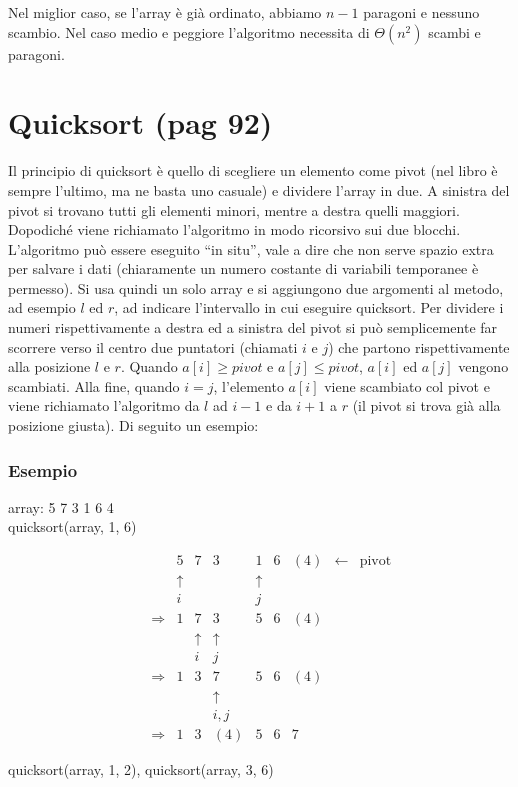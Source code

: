 \documentclass[a4paper]{book}
\begin{document}
Nel miglior caso, se l'array è già ordinato, abbiamo $n-1$ paragoni e nessuno scambio. Nel caso medio e peggiore l'algoritmo necessita di $\Theta (n^2)$ scambi e paragoni.

\section{Quicksort (pag 92)}
Il principio di quicksort è quello di scegliere un elemento come pivot (nel libro è sempre l'ultimo, ma ne basta uno casuale) e dividere l'array in due. A sinistra del pivot si trovano tutti gli elementi minori, mentre a destra quelli maggiori. Dopodiché viene richiamato l'algoritmo in modo ricorsivo sui due blocchi. L'algoritmo può essere eseguito ``in situ'', vale a dire che non serve spazio extra per salvare i dati (chiaramente un numero costante di variabili temporanee è permesso). Si usa quindi un solo array e si aggiungono due argomenti al metodo, ad esempio $l$ ed $r$, ad indicare l'intervallo in cui eseguire quicksort. Per dividere i numeri rispettivamente a destra ed a sinistra del pivot si può semplicemente far scorrere verso il centro due puntatori (chiamati $i$ e $j$) che partono rispettivamente alla posizione $l$ e $r$. Quando $a[i] \geq pivot$ e $a[j] \leq pivot$, $a[i]$ ed $a[j]$ vengono scambiati. Alla fine, quando $i=j$, l'elemento $a[i]$ viene scambiato col pivot e viene richiamato l'algoritmo da $l$ ad $i-1$ e da $i+1$ a $r$ (il pivot si trova già alla posizione giusta). Di seguito un esempio:
\subsubsection*{Esempio}
\begin{center}
array: 5 7 3 1 6 4\\
quicksort(array, 1, 6)
\end{center}
\[\begin{array}{*{20}{c}}
{}&{}&{}&5&7&3&1&6&{(4)}& \leftarrow &{{\text{pivot}}}\\
{}&{}&{}& \uparrow &{}&{}& \uparrow &{}&{}&{}&{}\\
{}&{}&{}&i&{}&{}&j&{}&{}&{}&{}\\
{}&{}& \Rightarrow &1&7&3&5&6&{(4)}&{}&{}\\
{}&{}&{}&{}& \uparrow & \uparrow &{}&{}&{}&{}&{}\\
{}&{}&{}&{}&i&j&{}&{}&{}&{}&{}\\
{}&{}& \Rightarrow &1&3&7&5&6&{(4)}&{}&{}\\
{}&{}&{}&{}&{}& \uparrow &{}&{}&{}&{}&{}\\
{}&{}&{}&{}&{}&{i,j}&{}&{}&{}&{}&{}\\
{}&{}& \Rightarrow &1&3&{(4)}&5&6&7&{}&{}
\end{array}\]
\begin{center}quicksort(array, 1, 2), quicksort(array, 3, 6)\end{center}
\end{document}
